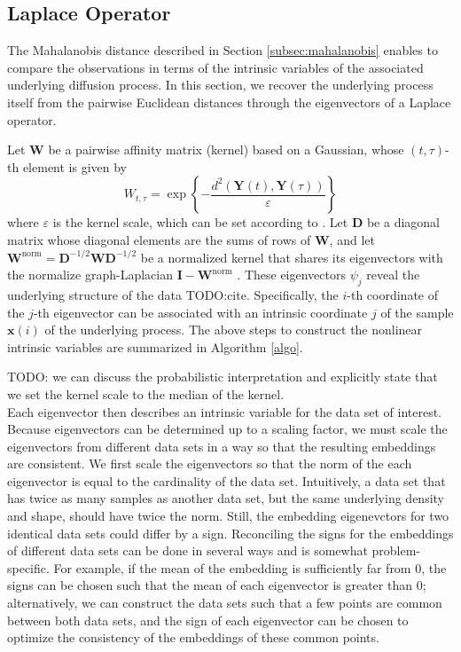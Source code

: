 \documentclass[aip,jcp,reprint,twocolumn]{revtex4-1}
\begin{document}
\subsection{Laplace Operator}
The Mahalanobis distance described in Section \ref{subsec:mahalanobis} enables to compare the observations in terms of the intrinsic variables of the associated underlying diffusion process.
%
In this section, we recover the underlying process itself from the pairwise Euclidean distances through the eigenvectors of a Laplace operator.

Let $\mathbf{W}$ be a pairwise affinity matrix (kernel) based on a Gaussian, whose $(t,\tau)$-th element is given by
\begin{equation}
	W_{t,\tau} = \exp \left\{ - \frac{ d^2(\mathbf{Y}(t), \mathbf{Y}(\tau) )} {\varepsilon}\right\}
	\label{eq:kernel}
\end{equation}
where $\varepsilon$ is the kernel scale, which can be set according to \cite{coifman2008graph}.
%
Let $\mathbf{D}$ be a diagonal matrix whose diagonal elements are the sums of rows of $\mathbf{W}$, and let $\mathbf{W}^{\mathrm{norm}} = \mathbf{D}^{-1/2}\mathbf{W}\mathbf{D}^{-1/2}$ be a normalized kernel that shares its eigenvectors with the normalize graph-Laplacian $\mathbf{I}-\mathbf{W}^{\mathrm{norm}}$ \cite{chung1997spectral}. 
%
These eigenvectors $\psi_j$ reveal the underlying structure of the data TODO:cite. 
%
Specifically, the $i$-th coordinate of the $j$-th eigenvector can be associated with an intrinsic coordinate $j$ of the sample $\mathbf{x}(i)$ of the underlying process. 
%
The above steps to construct the nonlinear intrinsic variables are summarized in Algorithm \ref{algo}.

TODO: we can discuss the probabilistic interpretation and explicitly state that we set the kernel scale to the median of the kernel.\\

Each eigenvector then describes an intrinsic variable for the data set of interest.
%
Because eigenvectors can be determined up to a scaling factor, we must scale the eigenvectors from different data sets in a way so that the resulting embeddings are consistent.
%
We first scale the eigenvectors so that the norm of the each eigenvector is equal to the cardinality of the data set.
%
Intuitively, a data set that has twice as many samples as another data set, but the same underlying density and shape, should have twice the norm.
%
Still, the embedding eigenevctors for two identical data sets could differ by a sign.
%
Reconciling the signs for the embeddings of different data sets can be done in several ways and is somewhat problem-specific.
%
For example, if the mean of the embedding is sufficiently far from 0, the signs can be chosen such that the mean of each eigenvector is greater than 0;
alternatively, we can construct the data sets such that a few points are common between both data sets, and the sign of each eigenvector can be chosen to optimize the consistency of the embeddings of these common points.
\end{document}
